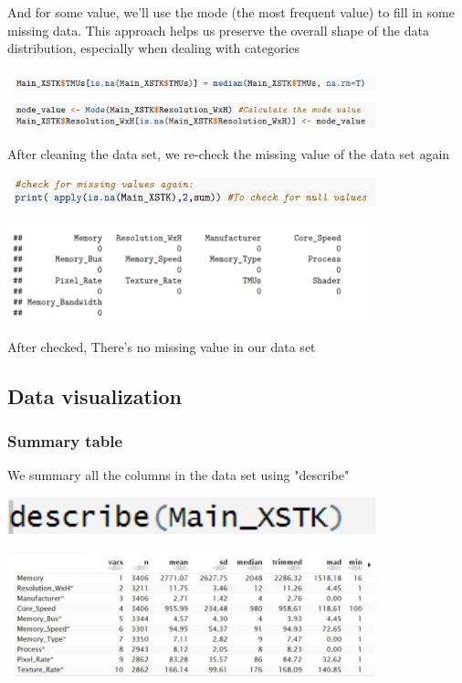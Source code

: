 \tab And for some value, we'll use the mode (the most frequent value) to fill in some missing data. This approach helps us preserve the overall shape of the data distribution, especially when dealing with categories
\begin{center}
    \includegraphics[width=0.8\textwidth]{clean2.png}
\end{center}

\tab After cleaning the data set, we re-check the missing value of the data set again
\begin{center}
    \includegraphics[width=0.8\textwidth]{check.png}
\end{center}
\begin{center}
    \includegraphics[width=0.8\textwidth]{checked.png}
\end{center}

\tab After checked, There's no missing value in our data set

\subsection{Data visualization}
\subsubsection{Summary table}
\tab We summary all the columns in the data set using "describe"
\begin{center}
    \includegraphics[width=0.8\textwidth]{des.png}
\end{center}
\begin{center}
    \includegraphics[width=0.8\textwidth]{des1.png}
\end{center}

